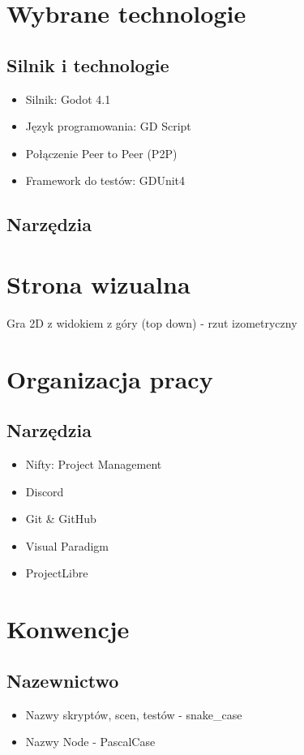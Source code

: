 \documentclass[]{report}
\begin{document}
\section{Wybrane technologie}
\subsection{Silnik i technologie}
	\begin{itemize}
		\item Silnik: Godot 4.1
		\item Język programowania: GD Script
		\item Połączenie Peer to Peer (P2P)
		\item Framework do testów: GDUnit4
	\end{itemize}
\subsection{Narzędzia}

\section{Strona wizualna}
Gra 2D z widokiem z góry (top down) - rzut izometryczny

\section{Organizacja pracy}
\subsection{Narzędzia}
	\begin{itemize}
		\item Nifty: Project Management
		\item Discord
		\item Git \& GitHub
		\item Visual Paradigm
		\item ProjectLibre
	\end{itemize}

\section{Konwencje}
\subsection{Nazewnictwo}
	\begin{itemize}
		\item Nazwy skryptów, scen, testów - snake\_case
		\item Nazwy Node - PascalCase
	
	\end{itemize}
	
\end{document}
